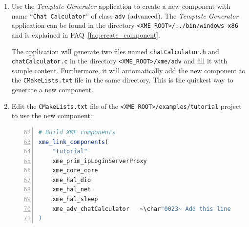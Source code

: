 \begin{enumerate}
	\item Use the \emph{Template Generator} application to create a new component with name ``\texttt{Chat Calculator}'' of class \verb|adv| (advanced).
		The \emph{Template Generator} application can be found in the directory \verb|<XME_ROOT>/../bin/windows_x86| and is explained in FAQ~\ref{faq:create_component}.
		
		The application will generate two files named \verb|chatCalculator.h| and \verb|chatCalculator.c|
		in the directory \verb|<XME_ROOT>/xme/adv| and fill it with sample content.
		Furthermore, it will automatically add the new component to the \verb|CMakeLists.txt| file in the same directory.
		This is the quickest way to generate a new \xme component.

%

%

	\item Edit the \verb|CMakeLists.txt| file of the \verb|<XME_ROOT>/examples/tutorial| project to use the new component:

\begin{lstlisting}[language=cmake,numbers=left,firstnumber=62]
# Build XME components
xme_link_components(
	"tutorial"
	xme_prim_ipLoginServerProxy
	xme_core_core
	xme_hal_dio
	xme_hal_net
	xme_hal_sleep
	xme_adv_chatCalculator   ~\char"0023~ Add this line
)
\end{lstlisting}


\end{enumerate}
